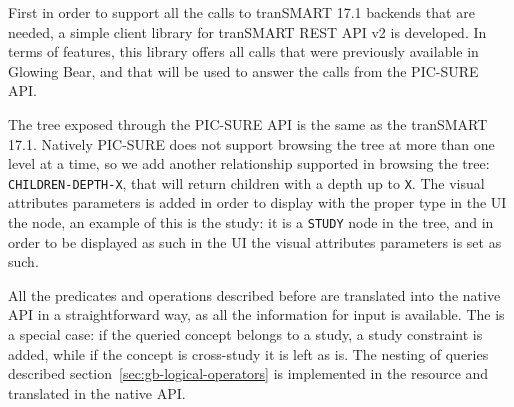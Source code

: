 First in order to support all the calls to tranSMART 17.1 backends that are needed, a simple client library for tranSMART REST API v2 is developed.
In terms of features, this library offers all calls that were previously available in Glowing Bear, and that will be used to answer the calls from the PIC-SURE API.

The tree exposed through the PIC-SURE API is the same as the tranSMART 17.1.
Natively PIC-SURE does not support browsing the tree at more than one level at a time, so we add another relationship supported in browsing the tree: \verb|CHILDREN-DEPTH-X|, that will return children with a depth up to \verb|X|.
The visual attributes parameters is added in order to display with the proper type in the UI the node, an example of this is the study: it is a \verb|STUDY| node in the tree, and in order to be displayed as such in the UI the visual attributes parameters is set as such.

All the predicates and operations described before are translated into the native API in a straightforward way, as all the information for input is available.
The is a special case: if the queried concept belongs to a study, a study constraint is added, while if the concept is cross-study it is left as is.
The nesting of queries described section~\ref{sec:gb-logical-operators} is implemented in the resource and translated in the native API.



